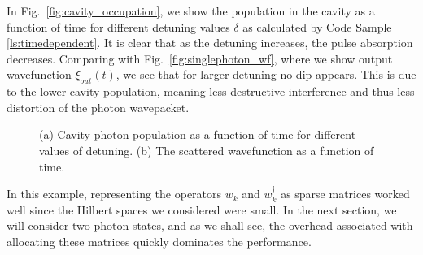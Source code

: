 In Fig.~\ref{fig:cavity_occupation}, we show the population in the cavity as a function of time for different detuning values $\delta$ as calculated by Code Sample \ref{ls:timedependent}. It is clear that as the detuning increases, the pulse absorption decreases. Comparing with Fig.~\ref{fig:singlephoton_wf}, where we show output wavefunction $\xi_{out}(t)$, we see that for larger detuning no dip appears. This is due to the lower cavity population, meaning less destructive interference and thus less distortion of the photon wavepacket. 

\begin{figure}[H]
    \centering
        
    \caption{(a) Cavity photon population as a function of time for different values of detuning. (b) The scattered wavefunction as a function of time.}
\end{figure}


In this example, representing the operators $w_k$ and $w_k^\dagger$ as sparse matrices worked well since the Hilbert spaces we considered were small. In the next section, we will consider two-photon states, and as we shall see, the overhead associated with allocating these matrices quickly dominates the performance. 


